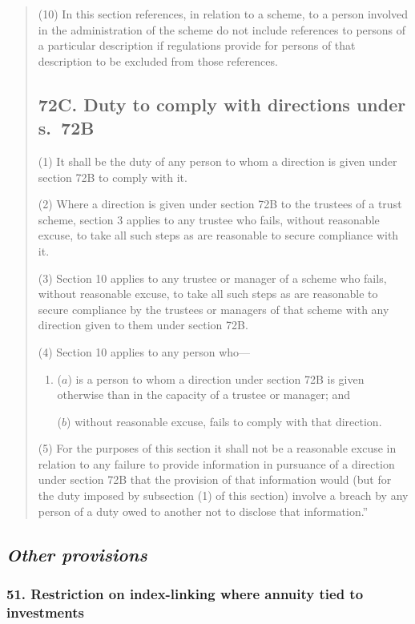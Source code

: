 \documentclass[12pt,a4paper]{article}
\begin{document}
\begin{quotation}
(10) In this section references, in relation to a scheme, to a person involved in the administration of the scheme do not include references to persons of a particular description if regulations provide for persons of that description to be excluded from those references.

\subsection*{72C. Duty to comply with directions under s.\ 72B}

(1) It shall be the duty of any person to whom a direction is given under section 72B to comply with it.

(2) Where a direction is given under section 72B to the trustees of a trust scheme, section 3 applies to any trustee who fails, without reasonable excuse, to take all such steps as are reasonable to secure compliance with it.

(3) Section 10 applies to any trustee or manager of a scheme who fails, without reasonable excuse, to take all such steps as are reasonable to secure compliance by the trustees or managers of that scheme with any direction given to them under section 72B.

(4) Section 10 applies to any person who—
\begin{enumerate}\item[]
($a$) is a person to whom a direction under section 72B is given otherwise than in the capacity of a trustee or manager; and

($b$) without reasonable excuse, fails to comply with that direction.
\end{enumerate}

(5) For the purposes of this section it shall not be a reasonable excuse in relation to any failure to provide information in pursuance of a direction under section 72B that the provision of that information would (but for the duty imposed by subsection (1)  of this section) involve a breach by any person of a duty owed to another not to disclose that information.”
\end{quotation}

\subsection{\itshape Other provisions}

\subsubsection{51. Restriction on index-linking where annuity tied to investments}
\end{document}
